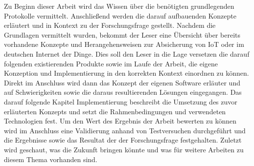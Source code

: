 Zu Beginn dieser Arbeit wird das Wissen über die benötigten grundlegenden Protokolle vermittelt.
Anschließend werden die darauf aufbauenden Konzepte erläutert und in Kontext zu der Forschungsfrage gestellt.
Nachdem die Grundlagen vermittelt wurden, bekommt der Leser eine Übersicht über bereits vorhandene Konzepte und Herangehensweisen zur Absicherung von \ac{IoT} oder im deutschen Internet der Dinge. Dies soll den Leser in die Lage versetzen die darauf folgenden existierenden Produkte sowie im Laufe der Arbeit, die eigene Konzeption und Implementierung in den korrekten Kontext einordnen zu können.
Direkt im Anschluss wird dann das Konzept der eigenen Software erläuter und auf Schwierigkeiten sowie die daraus resultierenden Lösungen eingegangen. Das darauf folgende Kapitel \glqq Implementierung\grqq{} beschreibt die Umsetzung des zuvor erläuterten Konzepts und setzt die Rahmenbedingungen und verwendeten Technologien fest. Um den Wert des Ergebnis der Arbeit bewerten zu können wird im Anschluss eine Validierung anhand von Testversuchen durchgeführt und die Ergebnisse sowie das Resultat der der Forschungsfrage festgehalten. Zuletzt wird geschaut, was die Zukunft bringen könnte und was für weitere Arbeiten zu diesem Thema vorhanden sind.